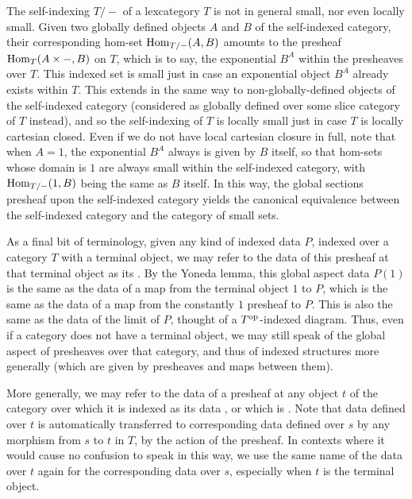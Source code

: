 The self-indexing $T/-$ of a lexcategory $T$ is not in general small, nor even locally small. Given two globally defined objects $A$ and $B$ of the self-indexed category, their corresponding hom-set $\operatorname{Hom}_{T/-}(A, B)$ amounts to the presheaf $\operatorname{Hom}_{T}(A \times -, B)$ on $T$, which is to say, the exponential $B^A$ within the presheaves over $T$. This indexed set is small just in case an exponential object $B^A$ already exists within $T$. This extends in the same way to non-globally-defined objects of the self-indexed category (considered as globally defined over some slice category of $T$ instead), and so the self-indexing of $T$ is locally small just in case $T$ is locally cartesian closed. Even if we do not have local cartesian closure in full, note that when $A = 1$, the exponential $B^A$ always is given by $B$ itself, so that hom-sets whose domain is $1$ are always small within the self-indexed category, with $\operatorname{Hom}_{T/-}(1, B)$ being the same as $B$ itself. In this way, the global sections presheaf upon the self-indexed category yields the canonical equivalence between the self-indexed category and the category of small sets.

As a final bit of terminology, given any kind of indexed data $P$, indexed over a category $T$ with a terminal object, we may refer to the data of this presheaf at that terminal object as its . By the Yoneda lemma, this global aspect data $P(1)$ is the same as the data of a map from the terminal object $1$ to $P$, which is the same as the data of a map from the constantly $1$ presheaf to $P$. This is also the same as the data of the limit of $P$, thought of a $T^{\mathrm{op}}$-indexed diagram. Thus, even if a category does not have a terminal object, we may still speak of the global aspect of presheaves over that category, and thus of indexed structures more generally (which are given by presheaves and maps between them).

More generally, we may refer to the data of a presheaf at any object $t$ of the category over which it is indexed as its data , or which is . Note that data defined over $t$ is automatically transferred to corresponding data defined over $s$ by any morphism from $s$ to $t$ in $T$, by the action of the presheaf. In contexts where it would cause no confusion to speak in this way, we use the same name of the data over $t$ again for the corresponding data over $s$, especially when $t$ is the terminal object. 


